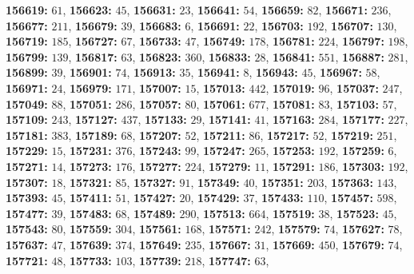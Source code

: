 \textsf{\bfseries 156619:} $61$, \textsf{\bfseries 156623:} $45$, \textsf{\bfseries 156631:} $23$, \textsf{\bfseries 156641:} $54$, \textsf{\bfseries 156659:} $82$, \textsf{\bfseries 156671:} $236$, \textsf{\bfseries 156677:} $211$, \textsf{\bfseries 156679:} $39$, \textsf{\bfseries 156683:} $6$, \textsf{\bfseries 156691:} $22$, \textsf{\bfseries 156703:} $192$, \textsf{\bfseries 156707:} $130$, \textsf{\bfseries 156719:} $185$, \textsf{\bfseries 156727:} $67$, \textsf{\bfseries 156733:} $47$, \textsf{\bfseries 156749:} $178$, \textsf{\bfseries 156781:} $224$, \textsf{\bfseries 156797:} $198$, \textsf{\bfseries 156799:} $139$, \textsf{\bfseries 156817:} $63$, \textsf{\bfseries 156823:} $360$, \textsf{\bfseries 156833:} $28$, \textsf{\bfseries 156841:} $551$, \textsf{\bfseries 156887:} $281$, \textsf{\bfseries 156899:} $39$, \textsf{\bfseries 156901:} $74$, \textsf{\bfseries 156913:} $35$, \textsf{\bfseries 156941:} $8$, \textsf{\bfseries 156943:} $45$, \textsf{\bfseries 156967:} $58$, \textsf{\bfseries 156971:} $24$, \textsf{\bfseries 156979:} $171$, \textsf{\bfseries 157007:} $15$, \textsf{\bfseries 157013:} $442$, \textsf{\bfseries 157019:} $96$, \textsf{\bfseries 157037:} $247$, \textsf{\bfseries 157049:} $88$, \textsf{\bfseries 157051:} $286$, \textsf{\bfseries 157057:} $80$, \textsf{\bfseries 157061:} $677$, \textsf{\bfseries 157081:} $83$, \textsf{\bfseries 157103:} $57$, \textsf{\bfseries 157109:} $243$, \textsf{\bfseries 157127:} $437$, \textsf{\bfseries 157133:} $29$, \textsf{\bfseries 157141:} $41$, \textsf{\bfseries 157163:} $284$, \textsf{\bfseries 157177:} $227$, \textsf{\bfseries 157181:} $383$, \textsf{\bfseries 157189:} $68$, \textsf{\bfseries 157207:} $52$, \textsf{\bfseries 157211:} $86$, \textsf{\bfseries 157217:} $52$, \textsf{\bfseries 157219:} $251$, \textsf{\bfseries 157229:} $15$, \textsf{\bfseries 157231:} $376$, \textsf{\bfseries 157243:} $99$, \textsf{\bfseries 157247:} $265$, \textsf{\bfseries 157253:} $192$, \textsf{\bfseries 157259:} $6$, \textsf{\bfseries 157271:} $14$, \textsf{\bfseries 157273:} $176$, \textsf{\bfseries 157277:} $224$, \textsf{\bfseries 157279:} $11$, \textsf{\bfseries 157291:} $186$, \textsf{\bfseries 157303:} $192$, \textsf{\bfseries 157307:} $18$, \textsf{\bfseries 157321:} $85$, \textsf{\bfseries 157327:} $91$, \textsf{\bfseries 157349:} $40$, \textsf{\bfseries 157351:} $203$, \textsf{\bfseries 157363:} $143$, \textsf{\bfseries 157393:} $45$, \textsf{\bfseries 157411:} $51$, \textsf{\bfseries 157427:} $20$, \textsf{\bfseries 157429:} $37$, \textsf{\bfseries 157433:} $110$, \textsf{\bfseries 157457:} $598$, \textsf{\bfseries 157477:} $39$, \textsf{\bfseries 157483:} $68$, \textsf{\bfseries 157489:} $290$, \textsf{\bfseries 157513:} $664$, \textsf{\bfseries 157519:} $38$, \textsf{\bfseries 157523:} $45$, \textsf{\bfseries 157543:} $80$, \textsf{\bfseries 157559:} $304$, \textsf{\bfseries 157561:} $168$, \textsf{\bfseries 157571:} $242$, \textsf{\bfseries 157579:} $74$, \textsf{\bfseries 157627:} $78$, \textsf{\bfseries 157637:} $47$, \textsf{\bfseries 157639:} $374$, \textsf{\bfseries 157649:} $235$, \textsf{\bfseries 157667:} $31$, \textsf{\bfseries 157669:} $450$, \textsf{\bfseries 157679:} $74$, \textsf{\bfseries 157721:} $48$, \textsf{\bfseries 157733:} $103$, \textsf{\bfseries 157739:} $218$, \textsf{\bfseries 157747:} $63$, 
